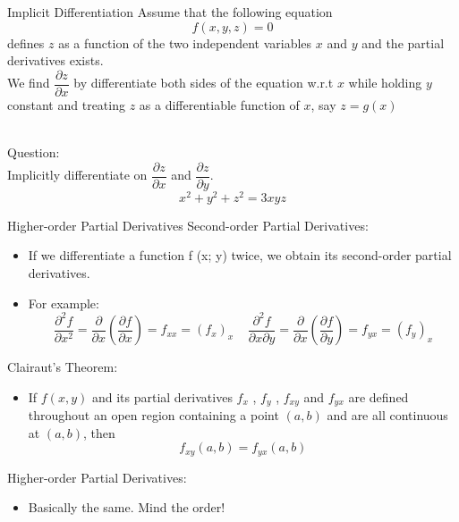 \documentclass[10pt]{beamer}
\begin{document}
\begin{frame}[allowframebreaks]{Implicit Differentiation}
Assume that the following equation $$f(x,y,z) = 0$$ defines $z$ as a function of the two independent variables $x$ and $y$ and the partial derivatives exists. 
\\We find $\dfrac{\partial z}{\partial x}$ by differentiate both sides of the equation w.r.t $x$ while holding $y$ constant and treating  $z$ as a differentiable function of $x$, say $z = g(x)$
\\~\\
{\color{purple}
	Question: 
	\\Implicitly differentiate on $\dfrac{\partial z}{\partial x}$ and $\dfrac{\partial z}{\partial y}$. $$x^2 + y^2 + z^2 = 3xyz$$
	
}
\end{frame}






\begin{frame}[allowframebreaks]{Higher-order Partial Derivatives}
	Second-order Partial Derivatives:
	\begin{itemize}
		\item If we differentiate a function f (x; y) twice, we obtain its second-order partial
		derivatives.
		\item For example:
		$$\dfrac{\partial^2f}{\partial x^2} = \dfrac{\partial}{\partial x}\left(\dfrac{\partial f}{\partial x}\right) = f_{xx}  = (f_x)_x~~~~~ \dfrac{\partial^2 f}{\partial x \partial y} = \dfrac{\partial}{\partial x}\left(\dfrac{\partial f}{\partial y}\right) = f_{yx} = (f_y)_x$$
	\end{itemize}
	
	Clairaut's Theorem:
	\begin{itemize}
		\item If $f(x, y)$ and its partial derivatives $f_x$ , $f_y$ , $f_{xy}$ and $f_{yx}$ are defined throughout an
		open region containing a point $(a, b)$ and are all continuous at $(a, b)$, then
		$$f_{xy} (a, b) = f_{yx} (a, b)$$
	\end{itemize}
	
	Higher-order Partial Derivatives:
	\begin{itemize}
		\item Basically the same. Mind the {\color{red}order}!
	\end{itemize}
	
\end{frame}
\end{document}
